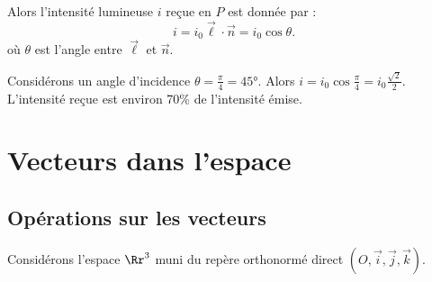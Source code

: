 \documentclass[11pt,class=report,crop=false]{standalone}
\begin{document}

Alors l'intensité lumineuse $i$ reçue en $P$ est donnée par :
$$
    i = i_0 \vec \ell \cdot \vec n = i_0 \cos \theta.
$$
où $\theta$ est l'angle entre $\vec \ell$ et $\vec n$.

\begin{exemple}
Considérons un angle d'incidence $\theta = \frac\pi4 = \ang{45}$.
Alors $i = i_0 \cos \frac{\pi}{4} = i_0 \frac{\sqrt{2}}{2}$.
L'intensité reçue est environ 70\% de l'intensité émise.
\end{exemple}



\section{Vecteurs dans l'espace}


\subsection{Opérations sur les vecteurs}

Considérons l'espace $\Rr^3$ muni du repère orthonormé direct $(O, \vec{i}, \vec{j}, \vec{k})$.
\end{document}
